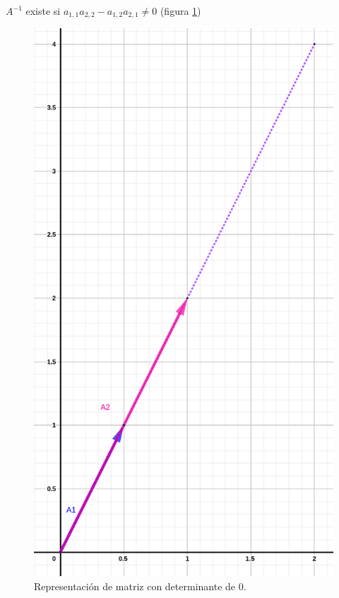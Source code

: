 \documentclass[
]{book}
\begin{document}
\(A^{-1}\) existe si \(a_{1,1}a_{2,2} - a_{1,2}a_{2,1} \neq 0\) (figura \ref{fig:det-3})

\begin{figure}

{\centering \includegraphics[width=12.81in]{Unidad-V/Deter-3} 

}

\caption{Representación de matriz con determinante de 0.}\label{fig:det-3}
\end{figure}
\end{document}

